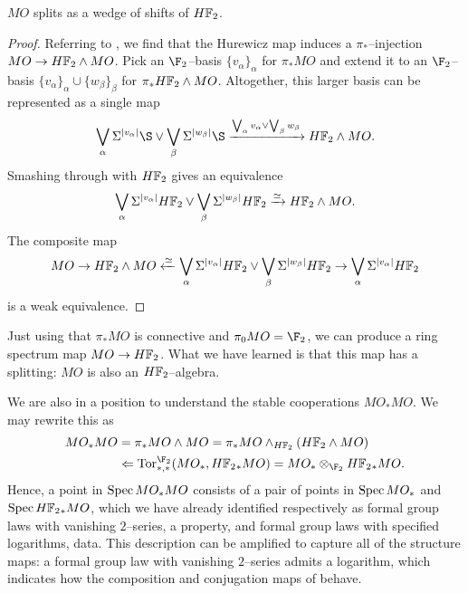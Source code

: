 \begin{lemma}\label{MOSplitsIntoHF2s}
\(MO\) splits as a wedge of shifts of \(\HFtwo\).
\end{lemma}
\begin{proof}
Referring to , we find that the Hurewicz map induces a \(\pi_*\)--injection \(MO \to \HFtwo \sm MO\).  Pick an \(\F_2\)--basis \(\{v_\alpha\}_\alpha\) for \(\pi_* MO\) and extend it to an \(\F_2\)--basis \(\{v_\alpha\}_\alpha \cup \{w_\beta\}_\beta\) for \(\pi_* \HFtwo \sm MO\).  Altogether, this larger basis can be represented as a single map \[\bigvee_\alpha \Susp^{|v_\alpha|} \S \vee \bigvee_\beta \Susp^{|w_\beta|} \S \xrightarrow{\bigvee_\alpha v_\alpha \vee \bigvee_\beta w_\beta} \HFtwo \sm MO.\]  Smashing through with \(\HFtwo\) gives an equivalence \[\bigvee_\alpha \Susp^{|v_\alpha|} \HFtwo \vee \bigvee_\beta \Susp^{|w_\beta|} \HFtwo \xrightarrow\simeq \HFtwo \sm MO.\]  The composite map \[MO \to \HFtwo \sm MO \xleftarrow\simeq \bigvee_\alpha \Susp^{|v_\alpha|} \HFtwo \vee \bigvee_\beta \Susp^{|w_\beta|} \HFtwo \to \bigvee_\alpha \Susp^{|v_\alpha|} \HFtwo\] is a weak equivalence.
\end{proof}

\begin{remark}
Just using that \(\pi_* MO\) is connective and \(\pi_0 MO = \F_2\), we can produce a ring spectrum map \(MO \to \HFtwo\).  What we have learned is that this map has a splitting: \(MO\) is also an \(\HFtwo\)--algebra.
\end{remark}

\begin{remark}
We are also in a position to understand the stable cooperations \(MO_* MO\).  We may rewrite this as
\begin{align*}
MO_* MO & = \pi_* MO \sm MO = \pi_* MO \sm_{\HFtwo} (\HFtwo \sm MO) \\
& \Leftarrow \Tor^{\F_2}_{*, *}(MO_*, \HFtwo_* MO) = MO_* \otimes_{\F_2} \HFtwo_* MO.
\end{align*}
Hence, a point in \(\operatorname{Spec} MO_* MO\) consists of a pair of points in \(\operatorname{Spec} MO_*\) and \(\Spec \HFtwo_* MO\), which we have already identified respectively as formal group laws with vanishing \(2\)--series, a property, and formal group laws with specified logarithms, data.  This description can be amplified to capture all of the structure maps: a formal group law with vanishing \(2\)--series admits a logarithm, which indicates how the composition and conjugation maps of  behave.
\end{remark}



